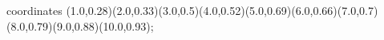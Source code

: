 					coordinates { (1.0,0.28)(2.0,0.33)(3.0,0.5)(4.0,0.52)(5.0,0.69)(6.0,0.66)(7.0,0.7)(8.0,0.79)(9.0,0.88)(10.0,0.93)};